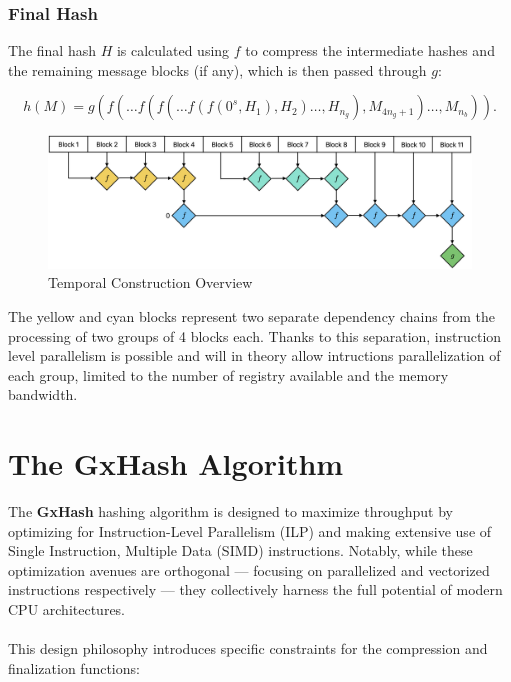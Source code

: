 \documentclass[10pt]{article}
\begin{document}
\subsubsection{Final Hash}

The final hash \( H \) is calculated using \( f \) to compress the intermediate hashes and the remaining message blocks (if any),
which is then passed through \( g \):

\begin{equation*}
h(M) = g\left( f( \ldots f(f(\ldots f(f(0^s, H_1), H_2) \ldots, H_{n_g}), M_{4{n_g}+1}) \ldots, M_{n_b} ) \right).
\end{equation*}

\begin{figure}[H]
\centering
\includegraphics[width=1\textwidth]{temporal-construction.png}
\caption{Temporal Construction Overview}
\label{fig:linear-construction}
\end{figure}

The yellow and cyan blocks represent two separate dependency chains from the processing of two groups of 4 blocks each. Thanks to this separation, instruction level parallelism is possible and will in theory allow intructions parallelization of each group, limited to the number of registry available and the memory bandwidth.

\clearpage
\section{The GxHash Algorithm}

The \textbf{GxHash} hashing algorithm is designed to maximize throughput by optimizing for Instruction-Level Parallelism (ILP) and making extensive use of Single Instruction, Multiple Data (SIMD) instructions. Notably, while these optimization avenues are orthogonal — focusing on parallelized and vectorized instructions respectively — they collectively harness the full potential of modern CPU architectures.\\\\
This design philosophy introduces specific constraints for the compression and finalization functions:
\end{document}
